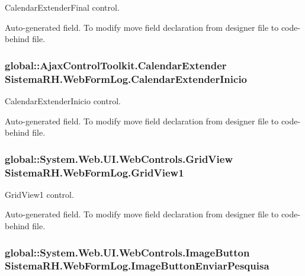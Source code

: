 CalendarExtenderFinal control. 

Auto-\/generated field. To modify move field declaration from designer file to code-\/behind file. \hypertarget{class_sistema_r_h_1_1_web_form_log_ab4f2a2e6c4083fdf161d797b91e580b7}{
\subsubsection[{CalendarExtenderInicio}]{\setlength{\rightskip}{0pt plus 5cm}global::AjaxControlToolkit.CalendarExtender {\bf SistemaRH.WebFormLog.CalendarExtenderInicio}}}
\label{class_sistema_r_h_1_1_web_form_log_ab4f2a2e6c4083fdf161d797b91e580b7}


CalendarExtenderInicio control. 

Auto-\/generated field. To modify move field declaration from designer file to code-\/behind file. \hypertarget{class_sistema_r_h_1_1_web_form_log_ae581455a5ace4f4cbf79e350caf770fb}{
\subsubsection[{GridView1}]{\setlength{\rightskip}{0pt plus 5cm}global::System.Web.UI.WebControls.GridView {\bf SistemaRH.WebFormLog.GridView1}}}
\label{class_sistema_r_h_1_1_web_form_log_ae581455a5ace4f4cbf79e350caf770fb}


GridView1 control. 

Auto-\/generated field. To modify move field declaration from designer file to code-\/behind file. \hypertarget{class_sistema_r_h_1_1_web_form_log_a6162fa2a5747787d0ad79ce5aa725cbb}{
\subsubsection[{ImageButtonEnviarPesquisa}]{\setlength{\rightskip}{0pt plus 5cm}global::System.Web.UI.WebControls.ImageButton {\bf SistemaRH.WebFormLog.ImageButtonEnviarPesquisa}}}
\label{class_sistema_r_h_1_1_web_form_log_a6162fa2a5747787d0ad79ce5aa725cbb}


